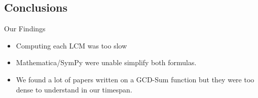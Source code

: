 \documentclass{beamer}
\begin{document}
\subsection{Conclusions}

\begin{frame}{Our Findings}
  \begin{itemize}
  \item Computing each LCM was too slow \vskip 10mm
  \item Mathematica/SymPy were unable simplify both formulas. \vskip 10mm
  \item We found a lot of papers written on a GCD-Sum function but they were
    too dense to understand in our timespan.
  \end{itemize}
\end{frame}
\end{document}
